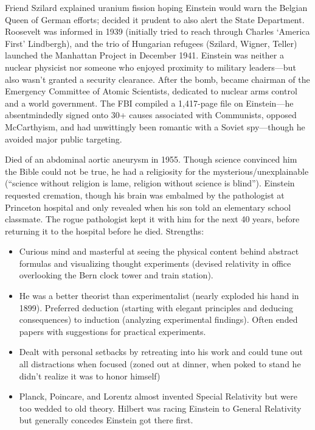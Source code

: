 \documentclass[
]{article}
\begin{document}
Friend Szilard explained uranium fission hoping Einstein would warn the
Belgian Queen of German efforts; decided it prudent to also alert the
State Department. Roosevelt was informed in 1939 (initially tried to
reach through Charles `America First' Lindbergh), and the trio of
Hungarian refugees (Szilard, Wigner, Teller) launched the Manhattan
Project in December 1941. Einstein was neither a nuclear physicist nor
someone who enjoyed proximity to military leaders---but also wasn't
granted a security clearance. After the bomb, became chairman of the
Emergency Committee of Atomic Scientists, dedicated to nuclear arms
control and a world government. The FBI compiled a 1,417-page file on
Einstein---he absentmindedly signed onto 30+ causes associated with
Communists, opposed McCarthyism, and had unwittingly been romantic with
a Soviet spy---though he avoided major public targeting.

Died of an abdominal aortic aneurysm in 1955. Though science convinced
him the Bible could not be true, he had a religiosity for the
mysterious/unexplainable (``science without religion is lame, religion
without science is blind''). Einstein requested cremation, though his
brain was embalmed by the pathologist at Princeton hospital and only
revealed when his son told an elementary school classmate. The rogue
pathologist kept it with him for the next 40 years, before returning it
to the hospital before he died. Strengths:

\begin{itemize}
\item
  Curious mind and masterful at seeing the physical content behind
  abstract formulas and visualizing thought experiments (devised
  relativity in office overlooking the Bern clock tower and train
  station).
\item
  He was a better theorist than experimentalist (nearly exploded his
  hand in 1899). Preferred deduction (starting with elegant principles
  and deducing consequences) to induction (analyzing experimental
  findings). Often ended papers with suggestions for practical
  experiments.
\item
  Dealt with personal setbacks by retreating into his work and could
  tune out all distractions when focused (zoned out at dinner, when
  poked to stand he didn't realize it was to honor himself)
\item
  Planck, Poincare, and Lorentz almost invented Special Relativity but
  were too wedded to old theory. Hilbert was racing Einstein to General
  Relativity but generally concedes Einstein got there first.
\end{itemize}
\end{document}
